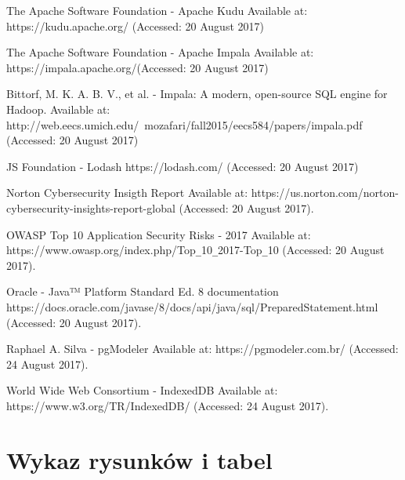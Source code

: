\documentclass[a4paper,12pt,twoside]{article}
\begin{document}
\begin{thebibliography}{99}
The Apache Software Foundation - Apache Kudu Available at:
https://kudu.apache.org/ (Accessed: 20 August 2017)

The Apache Software Foundation - Apache Impala Available at:
https://impala.apache.org/(Accessed: 20 August 2017)

Bittorf, M. K. A. B. V., et al. - Impala: A modern, open-source SQL engine for Hadoop.
Available at: http://web.eecs.umich.edu/~mozafari/fall2015/eecs584/papers/impala.pdf (Accessed: 20 August 2017)

JS Foundation - Lodash
https://lodash.com/ (Accessed: 20 August 2017)

Norton Cybersecurity Insigth Report 
Available at: https://us.norton.com/norton-cybersecurity-insights-report-global (Accessed: 20 August 2017).

OWASP Top 10 Application Security Risks - 2017 Available at: 
https://www.owasp.org/index.php/Top\verb!_!10\verb!_!2017-Top\verb!_!10 (Accessed: 20 August 2017).

Oracle - Java™ Platform Standard Ed. 8 documentation
https://docs.oracle.com/javase/8/docs/api/java/sql/PreparedStatement.html (Accessed: 20 August 2017).

Raphael A. Silva - pgModeler Available at: https://pgmodeler.com.br/
(Accessed: 24 August 2017).

World Wide Web Consortium - IndexedDB Available at: https://www.w3.org/TR/IndexedDB/
(Accessed: 24 August 2017).

\end{thebibliography}

\newpage
\section*{Wykaz rysunków i tabel}
\listoffigures
\listoftables
\end{document}
